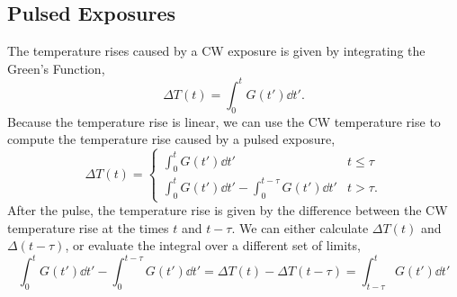 \documentclass[]{article}
\begin{document}
\subsection{Pulsed Exposures}

The temperature rises caused by a CW exposure is given by integrating the Green's Function,
\begin{equation}
  \Delta T(t) = \int_{0}^{t} G(t') \dd t'.
\end{equation}
Because the temperature rise is linear, we can use the CW temperature rise to compute
the temperature rise caused by a pulsed exposure,
\begin{equation}
  \Delta T(t) = \begin{cases}
    \int_{0}^{t} G(t') \dd t' & t \le \tau \\
    \int_{0}^{t} G(t') \dd t' - \int_{0}^{t-\tau} G(t') \dd t' & t > \tau.
\end{cases}
\end{equation}
After the pulse, the temperature rise is given by the difference between the CW temperature rise at the times $t$ and $t-\tau$.
We can either calculate $\Delta T(t)$ and $\Delta(t-\tau)$, or evaluate the integral over a different set of limits,
\begin{equation}
    \int_{0}^{t} G(t') \dd t' - \int_{0}^{t-\tau} G(t') \dd t'  = \Delta T(t) - \Delta T(t-\tau) = \int_{t-\tau}^{t} G(t') \dd t'
\end{equation}
\end{document}
